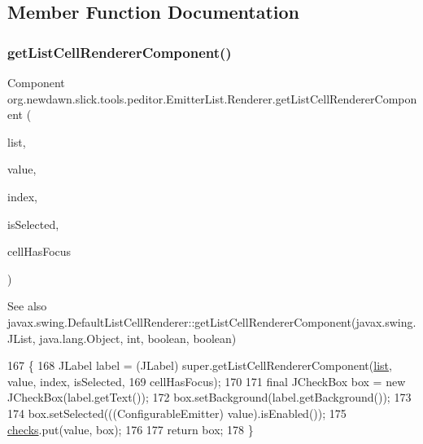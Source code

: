 \subsection{Member Function Documentation}
\mbox{\label{classorg_1_1newdawn_1_1slick_1_1tools_1_1peditor_1_1_emitter_list_1_1_renderer_a51309c374a3c26cbe839eda1087d9995}} 
\subsubsection{\texorpdfstring{get\+List\+Cell\+Renderer\+Component()}{getListCellRendererComponent()}}
{\footnotesize\ttfamily Component org.\+newdawn.\+slick.\+tools.\+peditor.\+Emitter\+List.\+Renderer.\+get\+List\+Cell\+Renderer\+Component (\begin{DoxyParamCaption}\item[{J\+List}]{list,  }\item[{final Object}]{value,  }\item[{int}]{index,  }\item[{boolean}]{is\+Selected,  }\item[{boolean}]{cell\+Has\+Focus }\end{DoxyParamCaption})\hspace{0.3cm}{\ttfamily [inline]}}

\begin{DoxySeeAlso}{See also}
javax.\+swing.\+Default\+List\+Cell\+Renderer\+::get\+List\+Cell\+Renderer\+Component(javax.\+swing.\+J\+List, java.\+lang.\+Object, int, boolean, boolean) 
\end{DoxySeeAlso}

\begin{DoxyCode}
167                                                                                                            
                                      \{
168             JLabel label = (JLabel) super.getListCellRendererComponent(\mbox{\hyperlink{classorg_1_1newdawn_1_1slick_1_1tools_1_1peditor_1_1_emitter_list_a201acbbfa375f50045f4f87452a9c722}{list}}, value, index, isSelected,
169                     cellHasFocus);
170             
171             \textcolor{keyword}{final} JCheckBox box = \textcolor{keyword}{new} JCheckBox(label.getText());
172             box.setBackground(label.getBackground());
173             
174             box.setSelected(((ConfigurableEmitter) value).isEnabled());
175             \mbox{\hyperlink{classorg_1_1newdawn_1_1slick_1_1tools_1_1peditor_1_1_emitter_list_ab4a9e11fc917db0ed6c38a4980a8ee4c}{checks}}.put(value, box);
176             
177             \textcolor{keywordflow}{return} box;
178         \}
\end{DoxyCode}
